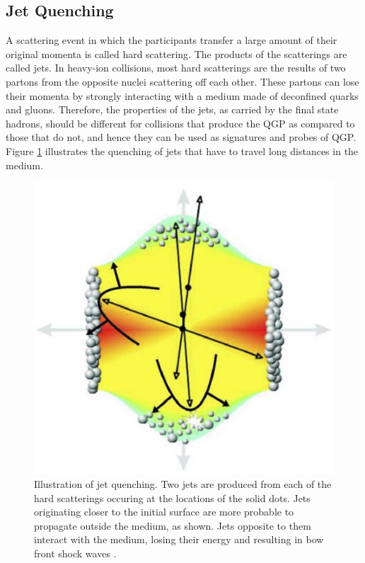 \subsection{Jet Quenching}
A scattering event in which the participants transfer a large amount of their original momenta is called hard scattering. The products of the scatterings are called jets. %
In heavy-ion collisions, most hard scatterings are the results of two partons from the opposite nuclei scattering off each other. These partons can lose their momenta by strongly interacting with a medium made of deconfined quarks and gluons. Therefore, the properties of the jets, as carried by the final state hadrons, should be different for collisions that produce the QGP as compared to those that do not, and hence they can be used as signatures and probes of QGP. Figure \ref{fig:jets} illustrates the quenching of jets that have to travel long distances in the medium. %
	\begin{figure}[h]
	  \centering
	  \includegraphics[width=4.5in]{figures/jets.PNG}
	  \caption{Illustration of jet quenching. Two jets are produced from each of the hard scatterings occuring at the locations of the solid dots. Jets originating closer to the initial surface are more probable to propagate outside the medium, as shown. Jets opposite to them interact with the medium, losing their energy and resulting in bow front shock waves \cite{STOCKER2005121}.}\label{fig:jets}
	\end{figure}

